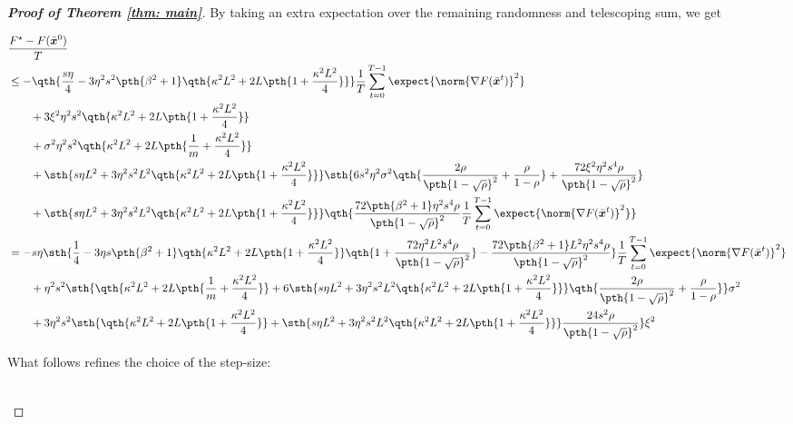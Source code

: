 \documentclass[letterpaper, 10 pt, conference]{ieeeconf}  %
\newcommand{\x}{{\bm x}}
\begin{document}
\begin{proof}[\bf Proof of Theorem \ref{thm: main}]
By taking an extra expectation over the remaining randomness and telescoping sum, we get
\begin{small}
\begin{align*}
&\frac{F^\star - F(\bar{\x}^0)}{T}\\
& \le - \qth{\frac{s\eta}{4} - 3\eta^2s^2\pth{\beta^2 + 1}\qth{\kappa^2 L^2 + 2 L \pth{1 + \frac{\kappa^2 L^2}{4}}}}\frac{1}{T}\sum_{t=0}^{T-1}\expect{\norm{\nabla F(\bar{\x}^t)}^2}\\
& \qquad +  3\xi^2 \eta^2 s^2 \qth{\kappa^2 L^2 + 2 L \pth{1 + \frac{\kappa^2 L^2}{4}}}\\
& \qquad +  \sigma^2 \eta^2 s^2 \qth{\kappa^2 L^2 + 2 L \pth{\frac{1}{m} + \frac{\kappa^2 L^2}{4}}}\\
& \qquad + \sth{s \eta L^2 + 3\eta^2 s^2 L^2\qth{\kappa^2 L^2 + 2 L \pth{1 + \frac{\kappa^2 L^2}{4}}}} 
    \sth{6 s^2 \eta^2 \sigma^2 \qth{\frac{2\rho }{\pth{1-\sqrt{\rho}}^2}
    + {\frac{\rho }{1-\rho} }}
    +\frac{72 \xi^2 \eta^2 s^4 \rho}{\pth{1-\sqrt{\rho}}^2}}\\
&\qquad + \sth{s \eta L^2 + 3\eta^2 s^2 L^2\qth{\kappa^2 L^2+ 2 L \pth{1 + \frac{\kappa^2 L^2}{4}}}}\qth{\frac{72 \pth{\beta^2 + 1} \eta^2 s^4 \rho}{\pth{1-\sqrt{\rho}}^2}\frac{1}{T}\sum_{t=0}^{T-1}\expect{\norm{\nabla F(\bar{\x}^t)}^2}}\\
& = - s \eta \sth{\frac{1}{4} - 3\eta s\pth{\beta^2 + 1}\qth{\kappa^2 L^2 + 2 L \pth{1 + \frac{\kappa^2 L^2}{4}}}\qth{1 + \frac{72 \eta^2 L^2 s^4 \rho}{\pth{1-\sqrt{\rho}}^2}}-\frac{72 \pth{\beta^2 + 1} L^2 \eta^2 s^4 \rho}{\pth{1-\sqrt{\rho}}^2}}\frac{1}{T}\sum_{t=0}^{T-1}\expect{\norm{\nabla F(\bar{\x}^t)}^2}\\
&\qquad + \eta^2 s^2 
\sth{\qth{\kappa^2 L^2 + 2 L \pth{\frac{1}{m} + \frac{\kappa^2 L^2}{4}}}
+ 6 \sth{s \eta L^2 + 3\eta^2 s^2 L^2\qth{\kappa^2 L^2 + 2 L \pth{1 + \frac{\kappa^2 L^2}{4}}}} 
    \qth{\frac{2\rho }{\pth{1-\sqrt{\rho}}^2}
    + {\frac{\rho }{1-\rho} }}
}\sigma^2\\
&\qquad + 3 \eta^2 s^2 \sth{
\qth{\kappa^2 L^2 + 2 L \pth{1 + \frac{\kappa^2 L^2}{4}}}
+ \sth{s \eta L^2 + 3\eta^2 s^2 L^2\qth{\kappa^2 L^2 + 2 L \pth{1 + \frac{\kappa^2 L^2}{4}}}}\frac{24 s^2 \rho}{\pth{1-\sqrt{\rho}}^2}
} \xi^2
\end{align*}
\end{small}
What follows refines the choice of the step-size:
\begin{footnotesize}
\begin{align*}

\end{align*}
\end{footnotesize}
\end{proof}
\end{document}
